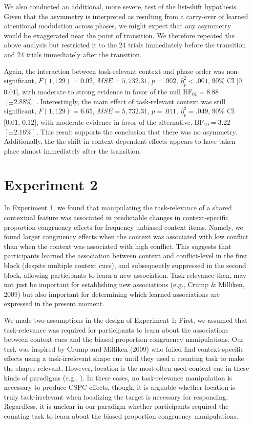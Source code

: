 \documentclass[english,,man,floatsintext]{apa6}
\begin{document}
We also conducted an additional, more severe, test of the list-shift hypothesis. Given that the asymmetry is interpreted as resulting from a carry-over of learned attentional modulation across phases, we might expect that any asymmetry would be exaggerated near the point of transition. We therefore repeated the above analysis but restricted it to the 24 trials immediately before the transition and 24 trials immediately after the transition.

Again, the interaction between task-relevant context and phase order was non-significant, \(F(1, 129) = 0.02\), \(\mathit{MSE} = 5,732.31\), \(p = .902\), \(\hat{\eta}^2_p < .001\), 90\% CI \([0\), \(0.01]\), with moderate to strong evidence in favor of the null \(\mathrm{BF}_{\textrm{01}} = 8.88\) \([\pm 2.88\%]\). Interestingly, the main effect of task-relevant context was still significant, \(F(1, 129) = 6.65\), \(\mathit{MSE} = 5,732.31\), \(p = .011\), \(\hat{\eta}^2_p = .049\), 90\% CI \([0.01\), \(0.12]\), with moderate evidence in favor of the alternative, \(\mathrm{BF}_{\textrm{10}} = 3.22\) \([\pm 2.16\%]\). This result supports the conclusion that there was no asymmetry. Additionally, the the shift in context-dependent effects appears to have taken place almost immediately after the transition.

\hypertarget{experiment-2}{%
\section{Experiment 2}\label{experiment-2}}

In Experiment 1, we found that manipulating the task-relevance of a shared contextual feature was associated in predictable changes in context-specific proportion congruency effects for frequency unbiased context items. Namely, we found larger congruency effects when the context was associated with low conflict than when the context was associated with high conflict. This suggests that participants learned the association between context and conflict-level in the first block (despite multiple context cues), and subsequently suppressed in the second block, allowing participants to learn a new association. Task-relevance then, may not just be important for establishing new associations (e.g., Crump \& Milliken, 2009) but also important for determining which learned associations are expressed in the present moment.

We made two assumptions in the design of Experiment 1: First, we assumed that task-relevance was required for participants to learn about the associations between context cues and the biased proportion congruency manipulations. Our task was inspired by Crump and Milliken (2009) who failed find context-specific effects using a task-irrelevant shape cue until they used a counting task to make the shapes relevant. However, location is the most-often used context cue in these kinds of paradigms (e.g., ). In these cases, no task-relevance manipulation is necessary to produce CSPC effects, though, it is arguable whether location is truly task-irrelevant when localizing the target is necessary for responding. Regardless, it is unclear in our paradigm whether participants required the counting task to learn about the biased proportion congruency manipulations.
\end{document}
